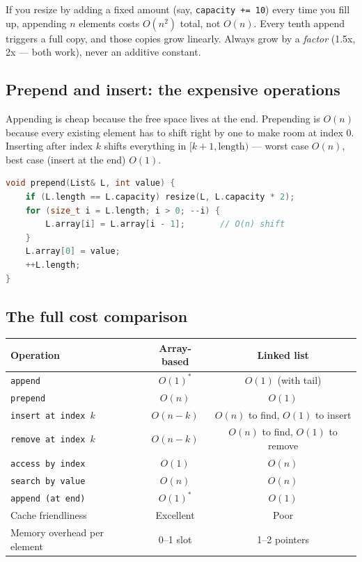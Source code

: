 \documentclass[11pt]{article}
\begin{document}
\begin{warnbox}
If you resize by adding a fixed amount (say, \texttt{capacity += 10})
every time you fill up, appending $n$ elements costs
$O(n^2)$ total, not $O(n)$. Every tenth append triggers a full
copy, and those copies grow linearly. Always grow by a \emph{factor}
(1.5x, 2x --- both work), never an additive constant.
\end{warnbox}

\subsection*{Prepend and insert: the expensive operations}

Appending is cheap because the free space lives at the end.
Prepending is \textbf{$O(n)$} because every existing element has
to shift right by one to make room at index 0. Inserting after
index $k$ shifts everything in $[k+1, \text{length})$ --- worst
case $O(n)$, best case (insert at the end) $O(1)$.

\begin{examplebox}
\begin{lstlisting}[language=C++,basicstyle=\ttfamily\small,frame=single]
void prepend(List& L, int value) {
    if (L.length == L.capacity) resize(L, L.capacity * 2);
    for (size_t i = L.length; i > 0; --i) {
        L.array[i] = L.array[i - 1];       // O(n) shift
    }
    L.array[0] = value;
    ++L.length;
}
\end{lstlisting}
\end{examplebox}

\subsection*{The full cost comparison}

\begin{center}
\begin{tabular}{|l|c|c|}
\hline
\textbf{Operation} & \textbf{Array-based} & \textbf{Linked list} \\
\hline
\texttt{append}                 & $O(1)^*$ & $O(1)$ (with tail) \\
\texttt{prepend}                & $O(n)$   & $O(1)$ \\
\texttt{insert at index $k$}    & $O(n-k)$ & $O(n)$ to find, $O(1)$ to insert \\
\texttt{remove at index $k$}    & $O(n-k)$ & $O(n)$ to find, $O(1)$ to remove \\
\texttt{access by index}        & $O(1)$   & $O(n)$ \\
\texttt{search by value}        & $O(n)$   & $O(n)$ \\
\texttt{append (at end)}        & $O(1)^*$ & $O(1)$ \\
Cache friendliness              & Excellent & Poor \\
Memory overhead per element     & 0--1 slot  & 1--2 pointers \\
\hline
\end{tabular}
\end{center}
\end{document}
